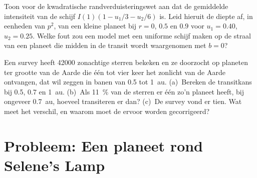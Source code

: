 \begin{exercise}[$\star\star\star$]\label{exo:b3:exoplanets:11}
Toon voor de kwadratische randverduisteringswet aan dat de gemiddelde intensiteit van
de schijf $I(1)(1 - u_1/3 - u_2/6)$ is. Leid hieruit de diepte af, in eenheden van
$p^2$, van een kleine planeet bij $r = 0$, $0.5$ en $0.9$ voor $u_1 = 0.40$,
$u_2 = 0.25$. Welke fout zou een model met een uniforme schijf maken op de straal van
een planeet die midden in de transit wordt waargenomen met $b = 0$?
\end{exercise}

\begin{exercise}[$\star\star\star$]\label{exo:b3:exoplanets:12}
Een survey heeft \num{42000} zonachtige sterren bekeken en ze doorzocht op
planeten ter grootte van de Aarde die één tot vier keer het zonlicht van de Aarde ontvangen,
dat wil zeggen in banen van 0.5 tot \qty{1}{au}. (a)~Bereken de transitkans
bij 0.5, 0.7 en \qty{1}{au}. (b)~Als \qty{11}{\percent} van de
sterren er één zo'n planeet heeft, bij ongeveer \qty{0.7}{au}, hoeveel transiteren er dan?
(c)~De survey vond er tien. Wat meet het verschil, en waarom moet
de  ervoor worden gecorrigeerd?
\end{exercise}

\section{Probleem: Een planeet rond Selene's Lamp}

